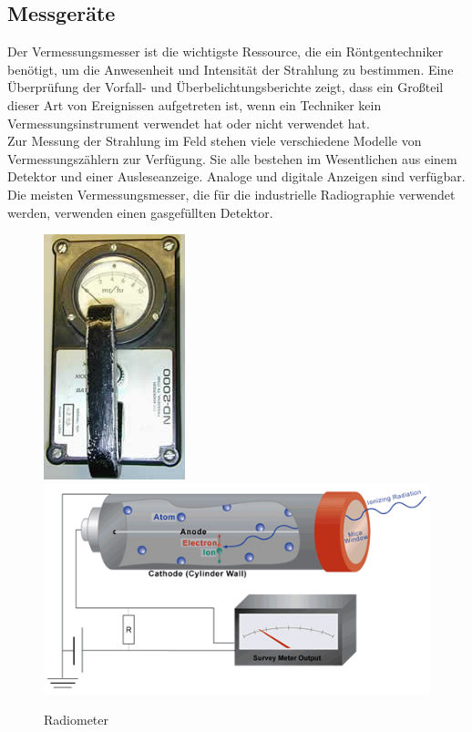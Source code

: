{\subsection{Messgeräte}
Der Vermessungsmesser ist die wichtigste Ressource, die ein Röntgentechniker benötigt, um die Anwesenheit und Intensität der Strahlung zu bestimmen. Eine Überprüfung der Vorfall- und Überbelichtungsberichte zeigt, dass ein Großteil dieser Art von Ereignissen aufgetreten ist, wenn ein Techniker kein Vermessungsinstrument verwendet hat oder nicht verwendet hat.\\
Zur Messung der Strahlung im Feld stehen viele verschiedene Modelle von Vermessungszählern zur Verfügung. Sie alle bestehen im Wesentlichen aus einem Detektor und einer Ausleseanzeige. Analoge und digitale Anzeigen sind verfügbar. Die meisten Vermessungsmesser, die für die industrielle Radiographie verwendet werden, verwenden einen gasgefüllten Detektor.\\
\begin{figure}[htb]
  \includegraphics[scale=0.5]{img/radiometer.jpg}
  \includegraphics [scale=0.5]{img/radiometer_technik.png}
  \caption{Radiometer}
  \label{fig:radiometer}
\end{figure}
}
